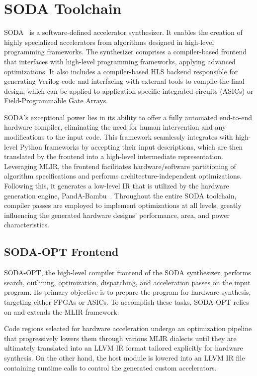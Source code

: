 \section{SODA Toolchain}
\label{sec:soda}%

SODA~\cite{9786533} is a software-defined accelerator synthesizer.
It enables the creation of highly specialized accelerators from algorithms designed in high-level programming frameworks.
The synthesizer comprises a compiler-based frontend that interfaces with high-level programming frameworks, applying advanced optimizations.
It also includes a compiler-based HLS backend responsible for generating Verilog code and interfacing with external tools to compile the final design, which can be applied to application-specific integrated circuits (ASICs) or Field-Programmable Gate Arrays.

SODA's exceptional power lies in its ability to offer a fully automated end-to-end hardware compiler, eliminating the need for human intervention and any modifications to the input code.
This framework seamlessly integrates with high-level Python frameworks by accepting their input descriptions, which are then translated by the frontend into a high-level intermediate representation.
Leveraging MLIR, the frontend facilitates hardware/software partitioning of algorithm specifications and performs architecture-independent optimizations.
Following this, it generates a low-level IR that is utilized by the hardware generation engine, PandA-Bambu~\cite{9586110}.
Throughout the entire SODA toolchain, compiler passes are employed to implement optimizations at all levels, greatly influencing the generated hardware designs' performance, area, and power characteristics.

\subsection{SODA-OPT Frontend}
\label{subsec:soda_frontend}%

SODA-OPT, the high-level compiler frontend of the SODA synthesizer, performs search, outlining, optimization, dispatching, and acceleration passes on the input program.
Its primary objective is to prepare the program for hardware synthesis, targeting either FPGAs or ASICs.
To accomplish these tasks, SODA-OPT relies on and extends the MLIR framework.

Code regions selected for hardware acceleration undergo an optimization pipeline that progressively lowers them through various MLIR dialects until they are ultimately translated into an LLVM IR format tailored explicitly for hardware synthesis.
On the other hand, the host module is lowered into an LLVM IR file containing runtime calls to control the generated custom accelerators.

